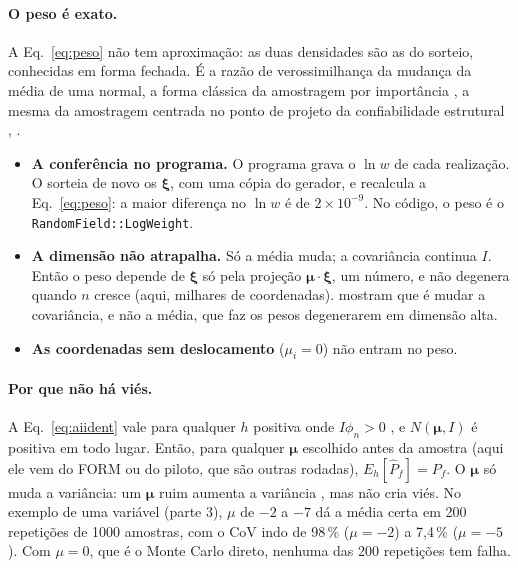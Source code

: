 \documentclass[11pt,a4paper]{article}
\newcommand{\xib}{\bm\xi}
\begin{document}
\paragraph{O peso é exato.} A Eq.~\eqref{eq:peso} não tem aproximação: as duas densidades são as do sorteio, conhecidas em
forma fechada. É a razão de verossimilhança da mudança da média de uma normal, a forma clássica da amostragem por
importância \citep[Seç.~4.6.1]{glasserman2004}, a mesma da amostragem centrada no ponto de projeto da confiabilidade
estrutural \citep[Seç.~6.3.3]{beck2014}, \citep{melchers1989, au2003}.
\begin{itemize}
  \item \textbf{A conferência no programa.} O programa grava o $\ln w$ de cada realização. O
     sorteia de novo os $\xib$, com uma cópia do gerador, e recalcula a Eq.~\eqref{eq:peso}: a
    maior diferença no $\ln w$ é de $2\times10^{-9}$. No código, o peso é o \texttt{RandomField::LogWeight}.
  \item \textbf{A dimensão não atrapalha.} Só a média muda; a covariância continua $I$. Então o peso depende de $\xib$
    só pela projeção $\bm\mu\cdot\xib$, um número, e não degenera quando $n$ cresce (aqui, milhares de coordenadas).
    \citet{au2003} mostram que é mudar a covariância, e não a média, que faz os pesos degenerarem em dimensão alta.
  \item \textbf{As coordenadas sem deslocamento} ($\mu_i = 0$) não entram no peso.
\end{itemize}

\paragraph{Por que não há viés.} A Eq.~\eqref{eq:aiident} vale para qualquer $h$ positiva onde
$I\phi_n > 0$ \citep[Cap.~9]{owen2013}, e $N(\bm\mu, I)$ é positiva em todo lugar. Então, para qualquer $\bm\mu$ escolhido
antes da amostra (aqui ele vem do FORM ou do piloto, que são outras rodadas), $E_h[\hat P_f] = P_f$. O $\bm\mu$ só muda a
variância: um $\bm\mu$ ruim aumenta a variância \citep[p.~160]{beck2014}, mas não cria viés. No exemplo de uma variável
(parte 3), $\mu$ de $-2$ a $-7$ dá a média certa em 200 repetições de 1000 amostras, com o CoV indo de 98\,\%
($\mu = -2$) a 7,4\,\% ($\mu = -5$). Com $\mu = 0$, que é o Monte Carlo direto, nenhuma das 200 repetições tem falha.
\end{document}
